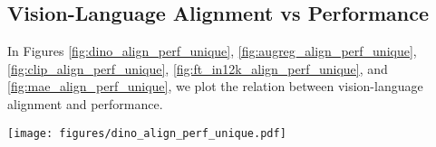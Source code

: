 

\subsection{Vision-Language Alignment vs Performance}\label{app:vision_language_align_perf}

In Figures \ref{fig:dino_align_perf_unique}, \ref{fig:augreg_align_perf_unique}, \ref{fig:clip_align_perf_unique}, \ref{fig:ft_in12k_align_perf_unique}, and \ref{fig:mae_align_perf_unique}, we plot the relation between vision-language alignment and performance. 






\begin{figure*}[t!]
    \centering
    \texttt{[image: figures/dino\_align\_perf\_unique.pdf]}
    \caption{\textbf{DINOv2 Vision-Language Alignment vs Performance.} We plot the vision-language alignment using DINOv2 vision models  with respect to language model performance, measured using \texttt{bits-per-byte-loss} and show individual best fit lines for each size of vision model as well as the average Pearson correlation coefficient $r$. }
    \label{fig:dino_align_perf_unique}
\end{figure*}

